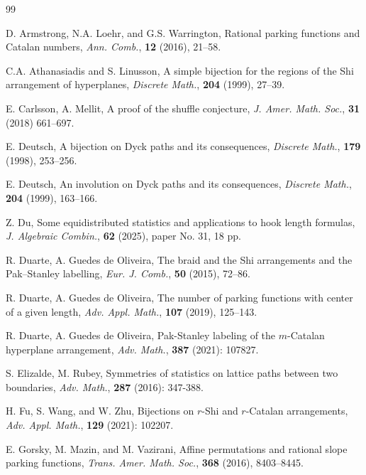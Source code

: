 \documentclass[11pt,a4paper,reqno]{article}
\begin{document}
{\begin{thebibliography}{99}
		
		
		
		
		
		

		 D. Armstrong, N.A. Loehr, and G.S. Warrington, Rational parking functions and Catalan numbers, {\it Ann. Comb.}, \textbf{12} (2016), 21--58.

         C.A. Athanasiadis and S. Linusson, A simple bijection for the regions of the Shi arrangement of hyperplanes, {\it Discrete Math.}, \textbf{204} (1999), 27--39.


        
		 E. Carlsson, A. Mellit, A proof of the shuffle conjecture, {\it J. Amer. Math. Soc.}, \textbf{31} (2018) 661--697.
		
		 E. Deutsch, A bijection on Dyck paths and its consequences, {\it Discrete Math.}, {\bf 179} (1998), 253--256.
		
		 E. Deutsch, An involution on Dyck paths and its consequences, {\it Discrete Math.}, \textbf{204} (1999), 163--166.
		
		

         Z. Du, Some equidistributed statistics and applications to hook length formulas, {\it J. Algebraic Combin.}, {\bf 62} (2025), paper No. 31, 18 pp.
        
         R. Duarte, A. Guedes de Oliveira, The braid and the Shi arrangements and the Pak–Stanley labelling, {\it Eur. J. Comb.}, \textbf{50} (2015), 72--86.

		R. Duarte, A. Guedes de Oliveira, The number of parking functions with center of a given length, {\it Adv. Appl. Math.}, \textbf{107} (2019), 125--143.

        R. Duarte, A. Guedes de Oliveira, Pak-Stanley labeling of the $m$-Catalan hyperplane arrangement, {\it Adv. Math.}, \textbf{387} (2021): 107827.

        S. Elizalde, M. Rubey, Symmetries of statistics on lattice paths between two boundaries, {\it Adv. Math.}, \textbf{287} (2016): 347-388.

         H. Fu, S. Wang, and W. Zhu, Bijections on $r$-Shi and $r$-Catalan arrangements, {\it Adv. Appl. Math.}, \textbf{129} (2021): 102207.
        
         E. Gorsky, M. Mazin, and M. Vazirani, Affine permutations and rational slope parking functions, {\it Trans. Amer. Math. Soc.}, \textbf{368} (2016), 8403--8445.
		

\end{thebibliography}}
\end{document}
